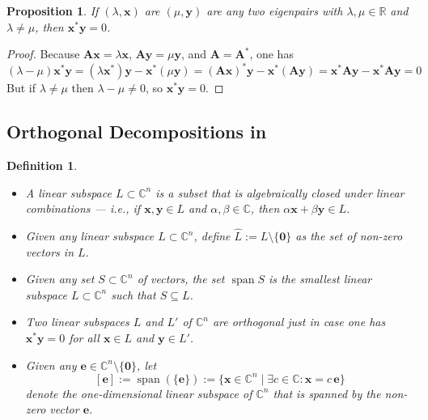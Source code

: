 \documentclass[11pt]{article}
\newcommand \R { \mathbb{R} }
\newcommand \C { \mathbb{C} }
\DeclareMathOperator{\spn}{{span}}
\newtheorem{proposition}[theorem]{Proposition}
\newtheorem{definition}[theorem]{Definition}
\begin{document}
\begin{proposition} \label{orthogSpaces}
	If $( \lambda, \mathbf x) $ are $( \mu, \mathbf y) $ are any two eigenpairs 
	with $ \lambda, \mu \in \R$ and $ \lambda \ne \mu $, then $ \mathbf x^* \mathbf y = 0$. 
\end{proposition}

\begin{proof}
	Because $ \mathbf {Ax} = \lambda \mathbf x$, $ \mathbf {Ay} = \mu \mathbf y$,
	and $ \mathbf A = \mathbf A^* $, one has
\[ ( \lambda - \mu ) \mathbf x^* \mathbf y
	= ( \lambda \mathbf x^* ) \mathbf y - \mathbf x^* ( \mu \mathbf y)
	= ( \mathbf {Ax} )^* \mathbf y - \mathbf x^* ( \mathbf {Ay} ) 
	= \mathbf x^* \mathbf {Ay} - \mathbf x^* \mathbf {Ay} = 0 \]
	But if $ \lambda \ne \mu $ then $ \lambda - \mu \ne 0$, so $ \mathbf x^* \mathbf y = 0$.
\end{proof}

\subsection{Orthogonal Decompositions in \protect{$ \C^n $}}

\begin{definition}
\begin{itemize}
	\item A \emph{linear subspace} $L \subset \C^n $ is a subset
	that is algebraically closed under linear combinations
	--- i.e., if $ \mathbf x, \mathbf y \in L$ and $ \alpha, \beta \in \C$,
	then $ \alpha \mathbf x + \beta \mathbf y \in L$.
	\item Given any linear subspace $L \subset \C^n $,
	define $ \hat L := L \setminus \{ \mathbf 0 \}$ as the set of non-zero vectors in $L$.
	\item Given any set $S \subset \C^n $ of vectors, 
	the set $ \spn S$ is the smallest linear subspace $L \subset \C^n $	
	such that $S \subseteq L$.
	\item Two linear subspaces $L$ and $L'$ of $ \C^n $ are \emph{orthogonal}
	just in case one has $ \mathbf x^* \mathbf y = 0$ 
	for all $ \mathbf x \in L$ and $ \mathbf y \in L'$.
	\item Given any $ \mathbf e \in \C^n \setminus \{ \mathbf 0\} $, let
 \[ [ \mathbf e] := \spn ( \{ \mathbf e \} )
 := \{ \mathbf x \in \C^n \mid \exists c \in \C : \mathbf x = c \, \mathbf e \} \]	
 	denote the one-dimensional linear subspace of $ \C^n $
	that is spanned by the non-zero vector $ \mathbf e$.
\end{itemize}
\end{definition}
\end{document}
